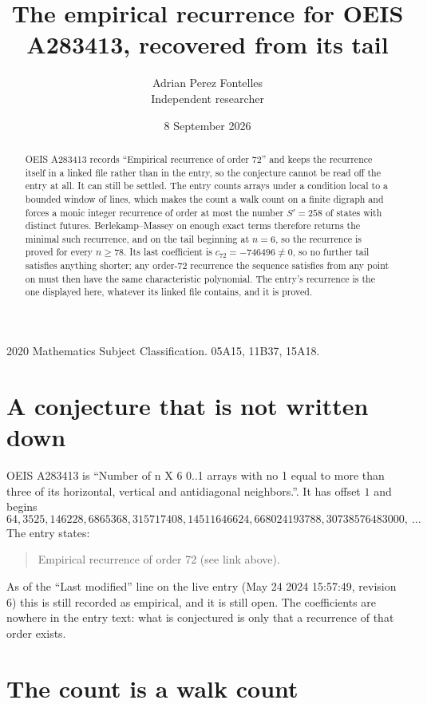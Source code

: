 \documentclass[11pt,a4paper]{article}
\title{The empirical recurrence for OEIS A283413, recovered from its tail}
\author{Adrian Perez Fontelles\\ \small Independent researcher}
\date{8 September 2026}
\theoremstyle{plain}
\theoremstyle{definition}
\begin{document}
\maketitle

\begin{abstract}
OEIS A283413 records ``Empirical recurrence of order $72$'' and keeps the recurrence itself in
a linked file rather than in the entry, so the conjecture cannot be read off the entry at all.
It can still be settled. The entry counts arrays under a condition local to a bounded window of
lines, which makes the count a walk count on a finite digraph and forces a monic integer
recurrence of order at most the number $S'=258$ of states with distinct futures. Berlekamp--Massey on
enough exact terms therefore returns the minimal such recurrence, and on the tail beginning at $n=6$, so the recurrence is proved for every $n\ge78$.
Its last coefficient is $c_{72}=-746496\neq0$, so no further tail satisfies anything
shorter; any order-$72$ recurrence the sequence satisfies from any point on must then have
the same characteristic polynomial. The entry's recurrence is the one displayed here, whatever
its linked file contains, and it is proved.
\end{abstract}

\noindent\small 2020 Mathematics Subject Classification. 05A15, 11B37, 15A18.\normalsize

\section{A conjecture that is not written down}

OEIS A283413 is ``Number of n X 6 0..1 arrays with no 1 equal to more than three of its horizontal, vertical and antidiagonal neighbors.''. It has offset $1$ and begins
\[
64, 3525, 146228, 6865368, 315717408, 14511646624, 668024193788, 30738576483000,\ \dots
\]
The entry states:
\begin{quote}
Empirical recurrence of order 72 (see link above).
\end{quote}
As of the ``Last modified'' line on the live entry (May 24 2024 15:57:49, revision 6)
this is still recorded as empirical, and it is still open. The coefficients are nowhere in the
entry text: what is conjectured is only that a recurrence of that order exists.

\section{The count is a walk count}
\end{document}
